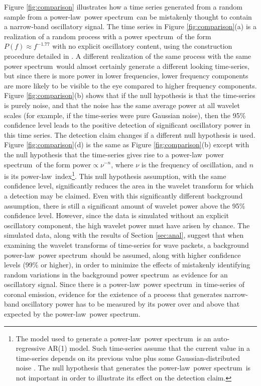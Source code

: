\documentclass[onecolumn]{emulateapj}
\newcommand{\PS}{power spectrum}
\newcommand{\PL}{power-law}
\newcommand{\BF}{ }
\begin{document}
Figure \ref{fig:comparison} illustrates how a time series generated
from a random sample from a \PL\ \PS\ can be mistakenly thought to
contain a narrow-band oscillatory signal.  The time series in Figure
\ref{fig:comparison}(a) {\BF is a realization of a random process with
  a \PS\ of the form $P(f)\approx f^{-1.77}$ with no explicit
  oscillatory content, using the construction procedure detailed in
  \cite{2010MNRAS.402..307V}.  A different realization of the same
  process with the same \PS\ would almost certainly generate a
  different looking time-series, but since there is more power in
  lower frequencies, lower frequency components are more likely to be
  visible to the eye compared to higher frequency components.}  {\BF
  Figure \ref{fig:comparison}(b) shows that if the null hypothesis is
  that the time-series is purely noise, and that the noise has the
  same average power at all wavelet scales (for example, if the
  time-series were pure Gaussian noise), then the 95\% confidence
  level leads to the positive detection of significant oscillatory
  power in this time series.}  {\BF The detection claim changes if a
  different null hypothesis is used. Figure \ref{fig:comparison}(d) is
  the same as Figure \ref{fig:comparison}(b) except with the null
  hypothesis that the time-series gives rise to a \PL\ \PS\ of the
  form $\mbox{power}\propto\nu^{-n}$, where $\nu$ is the frequency of
  oscillation, and $n$ is its \PL\ index}\footnote{{\BF The model
    used to generate a \PL\ \PS\ is an auto-regressive AR(1) model.
    Such time-series assume that the current value in a time-series
    depends on its previous value plus some Gaussian-distributed noise
    \citep{chatfieldtimeseries}.  The null hypothesis that generates
    the \PL\ \PS\ is not important in order to illustrate its effect
    on the detection claim.}}.  This null hypothesis assumption, with
the same confidence level, significantly reduces the area in the
wavelet transform for which a detection may be claimed.  Even with
this significantly different background assumption, there is still a
significant amount of wavelet power above the 95\% confidence level.
However, since the data is simulated without an explicit oscillatory
component, the high wavelet power must have arisen by chance.  The
simulated data, along with the results of Section \ref{sec:anal},
suggest that when examining the wavelet transforms of time-series for
wave packets, a background \PL\ \PS\ should be assumed, along with
higher confidence levels (99\% or higher), in order to minimize the
effects of mistakenly identifying random variations in the background
\PS\ as evidence for an oscillatory signal.  {\BF Since there is a
  \PL\ \PS\ in time-series of coronal emission, evidence for the
  existence of a process that generates narrow-band oscillatory power
  has to {\BF be} measured by its power over and above that expected by the
  \PL\ \PS.}
\end{document}
